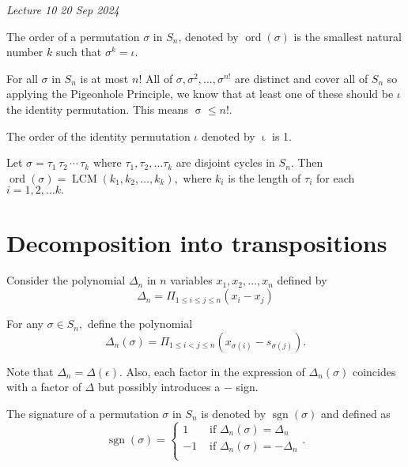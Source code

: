 \noindent
\emph{Lecture 10 \hfill 20 Sep 2024}

\begin{definition}
The order of a permutation $\sigma$ in $S_n$, denoted by $\operatorname{ord}(\sigma)$
is the smallest natural number $k$ such that $\sigma^k = \iota.$
\end{definition}

\begin{remark}
	For all $ \sigma$ in $S_n$ is at most $n!$ All of $ \sigma, \sigma^2, \dotsc, \sigma^{n!}$
	are distinct and cover all of $S_n$ so applying the Pigeonhole Principle, we know 
	that at least one of these should be $ \iota$ the identity permutation. This means
	$\operatorname{ \sigma} \leq n!.$ 
\end{remark}

\begin{remark}
	The order of the identity permutation $ \iota$ denoted by $\operatorname{ \iota} $
	is 1.
\end{remark}

\begin{corollary}
	Let $ \sigma = \tau_1 \, \tau_2 \, \cdots \, \tau_k$ where $ \tau_1, \tau_2, \dotsc
	\tau_k$ are disjoint cycles in $S_n.$ Then $\operatorname{ord}( \sigma) = 
	\operatorname{LCM}(k_1, k_2, \dotsc, k_k),$ where $k_i$ is the length of $ \tau_i$
	for each $i = 1, 2, \dotsc k.$
\end{corollary}

\section{Decomposition into transpositions}
Consider the polynomial $ \Delta_n$ in $n$ variables $x_1, x_2, \dotsc, x_n$ defined
by
$$ \Delta_n = \Pi _{1 \leq i \leq j \leq n} (x_i - x_j) $$

For any $ \sigma \in S_n,$ define the polynomial
$$ \Delta_n( \sigma) = \Pi _{1 \leq i < j \leq n} ( x _{\sigma(i) } - s _{ \sigma(j)} ). $$

Note that $ \Delta_n = \Delta( \epsilon) .$
Also, each factor in the expression of $ \Delta_n( \sigma) $ coincides with a factor of
$ \Delta $ but possibly introduces a $-$ sign.

\begin{definition}
	The signature of a permutation $ \sigma$ in $S_n$ is denoted by $\operatorname{sgn}
	( \sigma)$ and defined as
	$$ \operatorname{sgn}( \sigma) = \begin{cases}
	1 & \text{ if } \Delta_n(\sigma) = \Delta_n \\
	-1 & \text{ if } \Delta_n( \sigma) = - \Delta_n \\
	\end{cases}. $$
\end{definition}

